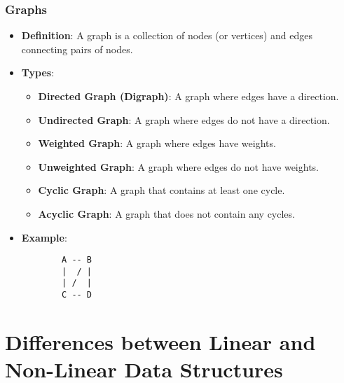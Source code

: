\documentclass{article}
\begin{document}
\subsubsection{Graphs}
\begin{itemize}
    \item \textbf{Definition}: A graph is a collection of nodes (or vertices) and edges connecting pairs of nodes. 
    \item \textbf{Types}:
    \begin{itemize}
        \item \textbf{Directed Graph (Digraph)}: A graph where edges have a direction.
        \item \textbf{Undirected Graph}: A graph where edges do not have a direction.
        \item \textbf{Weighted Graph}: A graph where edges have weights.
        \item \textbf{Unweighted Graph}: A graph where edges do not have weights.
        \item \textbf{Cyclic Graph}: A graph that contains at least one cycle.
        \item \textbf{Acyclic Graph}: A graph that does not contain any cycles.
    \end{itemize}
    \item \textbf{Example}: 
    \begin{verbatim}
        A -- B
        |  / |
        | /  |
        C -- D
    \end{verbatim}
\end{itemize}

\section{Differences between Linear and Non-Linear Data Structures}
\end{document}
